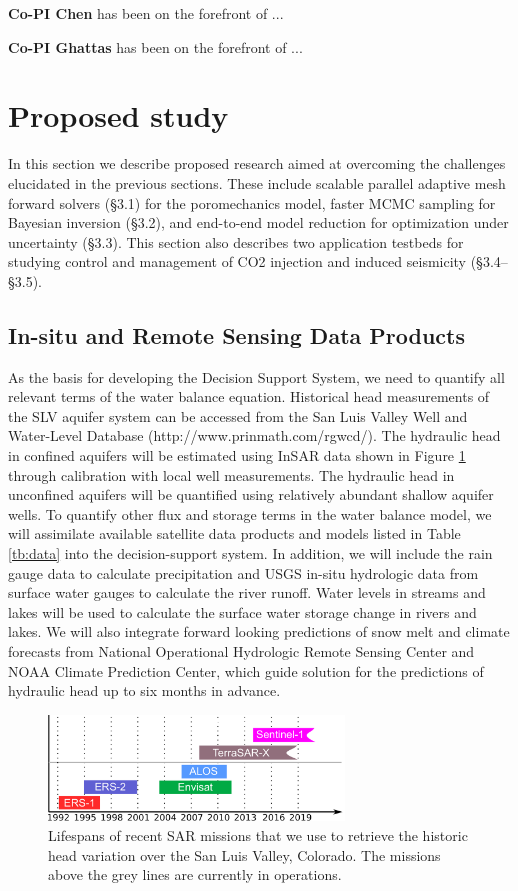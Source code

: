 \documentclass[11pt,final]{article}%
\begin{document}
\textbf{Co-PI Chen} has been on the forefront of ...

\textbf{Co-PI Ghattas} has been on the forefront of ...


\section{Proposed study}
In this section we describe proposed research aimed at overcoming the challenges elucidated in the previous sections. These include scalable parallel adaptive mesh forward solvers (§3.1) for the poromechanics model, faster MCMC sampling for Bayesian inversion (§3.2), and end-to-end model reduction for optimization under uncertainty (§3.3). This section also describes two application testbeds for studying control and management of CO2 injection and induced seismicity (§3.4–§3.5).
\subsection{In-situ and Remote Sensing Data Products}
As the basis for developing the Decision Support System, we need to quantify all relevant terms of the water balance equation. Historical head measurements of the SLV aquifer system can be accessed from the San Luis Valley Well and Water-Level Database (http://www.prinmath.com/rgwcd/). The hydraulic head in confined aquifers will be estimated using InSAR data shown in Figure \ref{fig:insar-mission} through calibration with local well measurements. The hydraulic head in unconfined aquifers will be quantified using relatively abundant shallow aquifer wells. To quantify other flux and storage terms in the water balance model, we will assimilate available satellite data products and models listed in Table \ref{tb:data} into the decision-support system. In addition, we will include the rain gauge data to calculate precipitation and USGS in-situ hydrologic data from surface water gauges to calculate the river runoff. Water levels in streams and lakes will be used to calculate the surface water storage change in rivers and lakes. We will also integrate forward looking predictions of snow melt and climate forecasts from National Operational Hydrologic Remote Sensing Center and NOAA Climate Prediction Center, which guide solution for the predictions of hydraulic head up to six months in advance.

\begin{figure}
\noindent\includegraphics[width=0.7\textwidth]{Figures/InSARmissions.pdf}
\caption{Lifespans of recent SAR missions that we use to retrieve the historic head variation over the San Luis Valley, Colorado. The missions above the grey lines are currently in operations.}
\label{fig:insar-mission}
\end{figure}
\end{document}
